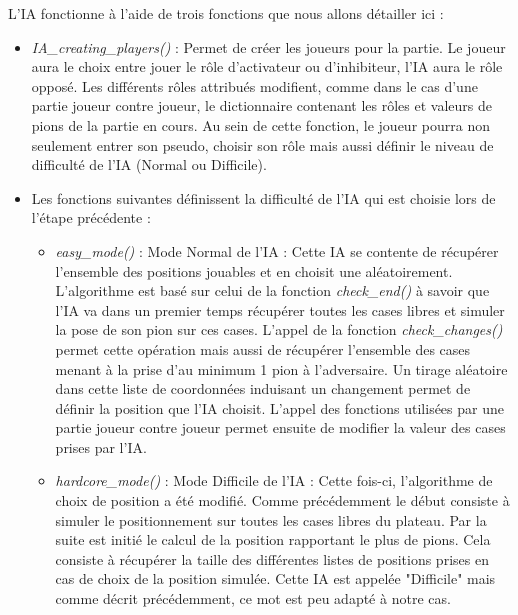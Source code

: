 L'IA fonctionne à l'aide de trois fonctions que nous allons détailler ici :
\begin{itemize}
	\item \emph{IA\_creating\_players()} : Permet de créer les joueurs pour la partie. Le joueur aura le choix entre jouer le rôle d'activateur ou d'inhibiteur, l'IA aura le rôle opposé. Les différents rôles attribués modifient, comme dans le cas d'une partie joueur contre joueur, le dictionnaire contenant les rôles et valeurs de pions de la partie en cours. Au sein de cette fonction, le joueur pourra non seulement entrer son pseudo, choisir son rôle mais aussi définir le niveau de difficulté de l'IA (Normal ou Difficile).
	\item Les fonctions suivantes définissent la difficulté de l'IA qui est choisie lors de l'étape précédente :
	\begin{itemize}
		\item \emph{easy\_mode()} : Mode Normal de l'IA : Cette IA se contente de récupérer l'ensemble des positions jouables et en choisit une aléatoirement. L'algorithme est basé sur celui de la fonction \textit{check\_end()} à savoir que l'IA va dans un premier temps récupérer toutes les cases libres et simuler la pose de son pion sur ces cases. L'appel de la fonction \textit{check\_changes()} permet cette opération mais aussi de récupérer l'ensemble des cases menant à la prise d'au minimum 1 pion à l'adversaire. Un tirage aléatoire dans cette liste de coordonnées induisant un changement permet de définir la position que l'IA choisit. L'appel des fonctions utilisées par une partie joueur contre joueur permet ensuite de modifier la valeur des cases prises par l'IA.
		\item \emph{hardcore\_mode()} : Mode Difficile de l'IA : Cette fois-ci, l'algorithme de choix de position a été modifié. Comme précédemment le début consiste à simuler le positionnement sur toutes les cases libres du plateau. Par la suite est initié le calcul de la position rapportant le plus de pions. Cela consiste à récupérer la taille des différentes listes de positions prises en cas de choix de la position simulée. Cette IA est appelée "Difficile" mais comme décrit précédemment, ce mot est peu adapté à notre cas. 
	\end{itemize}		
	
\end{itemize}

\newpage


